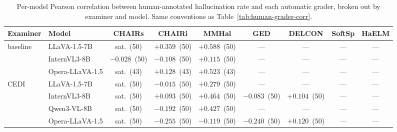 \begin{table}[!htbp]
\centering
\scriptsize
\setlength{\tabcolsep}{3pt}
\caption{Per-model Pearson correlation between human-annotated hallucination rate and each automatic grader, broken out by examiner and model. Same conventions as Table~\ref{tab:human-grader-corr}.}
\label{tab:per-model-grader-corr}
\begin{tabular}{ll|ccccccc}
\toprule
\textbf{Examiner} & \textbf{Model} & \textbf{CHAIRs} & \textbf{CHAIRi} & \textbf{MMHal} & \textbf{GED} & \textbf{DELCON} & \textbf{SoftSp} & \textbf{HaELM} \\
\midrule
baseline & LLaVA-1.5-7B & sat. \,\scriptsize(50) & $+0.359$ \,\scriptsize(50) & $+0.588$ \,\scriptsize(50) & --- & --- & --- & --- \\
 & InternVL3-8B & $-0.028$ \,\scriptsize(50) & $-0.108$ \,\scriptsize(50) & $+0.115$ \,\scriptsize(50) & --- & --- & --- & --- \\
 & Opera-LLaVA-1.5 & sat. \,\scriptsize(43) & $+0.128$ \,\scriptsize(43) & $+0.523$ \,\scriptsize(43) & --- & --- & --- & --- \\
\midrule
CEDI & LLaVA-1.5-7B & sat. \,\scriptsize(50) & $-0.015$ \,\scriptsize(50) & $+0.279$ \,\scriptsize(50) & --- & --- & --- & --- \\
 & InternVL3-8B & sat. \,\scriptsize(50) & $+0.093$ \,\scriptsize(50) & $+0.464$ \,\scriptsize(50) & $-0.083$ \,\scriptsize(50) & $+0.104$ \,\scriptsize(50) & --- & --- \\
 & Qwen3-VL-8B & sat. \,\scriptsize(50) & $-0.192$ \,\scriptsize(50) & $+0.427$ \,\scriptsize(50) & --- & --- & --- & --- \\
 & Opera-LLaVA-1.5 & sat. \,\scriptsize(50) & $-0.255$ \,\scriptsize(50) & $-0.119$ \,\scriptsize(50) & $-0.240$ \,\scriptsize(50) & $+0.120$ \,\scriptsize(50) & --- & --- \\
\bottomrule
\end{tabular}
\end{table}
